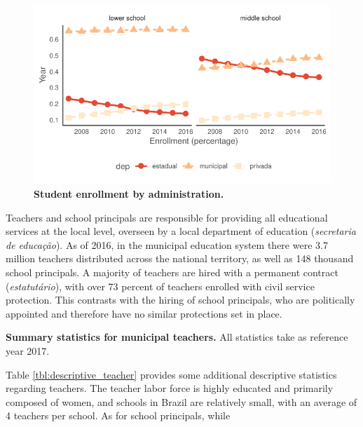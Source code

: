 \documentclass[12pt,a4paper]{article}
\begin{document}
\begin{figure}[h]
    \centering
    \includegraphics{plots/descriptive_enrollment.pdf}
    \caption{\textbf{Student enrollment by administration.}}
    \label{fig:enroll}
\end{figure}

Teachers and school principals are responsible for providing all educational services at the local level, overseen by a local department of education (\emph{secretaria de educa\c{c}\~{a}o}). As of 2016, in the municipal education system there were 3.7 million teachers distributed across the national territory, as well as 148 thousand school principals. A majority of teachers are hired with a permanent contract (\emph{estatutário}), with over 73 percent of teachers enrolled with civil service protection. This contrasts with the hiring of school principals, who are politically appointed and therefore have no similar protections set in place.

\begin{table}[t]
    
    \caption{\textbf{Summary statistics for municipal teachers.} All statistics take as reference year 2017.}
    \label{tbl:descriptive_teacher}
\end{table}

Table \ref{tbl:descriptive_teacher} provides some additional descriptive statistics regarding teachers. The teacher labor force is highly educated and primarily composed of women, and schools in Brazil are relatively small, with an average of 4 teachers per school. As for school principals, while 
\end{document}
